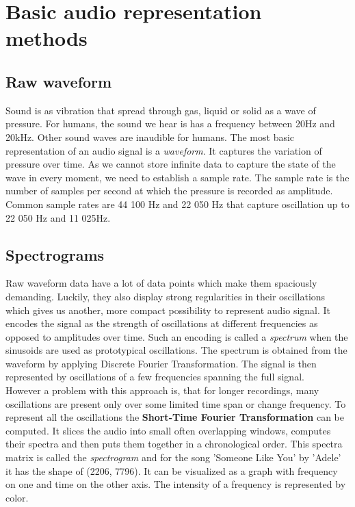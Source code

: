 \section{Basic audio representation methods}\label{sec:basic_music_representation_methods}
 

\subsection{Raw waveform}
Sound is as vibration that spread through gas, liquid or solid as a wave of pressure. For humans, the sound we hear is has a frequency between 20Hz and 20kHz. Other sound waves are inaudible for humans. The most basic representation of an audio signal is a \textit{waveform}. It captures the variation of pressure over time. As we cannot store infinite data to capture the state of the wave in every moment, we need to establish a sample rate. The sample rate is the number of samples per second at which the pressure is recorded as amplitude. Common sample rates are 44 100 Hz and 22 050 Hz that capture oscillation up to 22 050 Hz and 11 025Hz.

\subsection{Spectrograms}
Raw waveform data have a lot of data points which make them spaciously demanding. Luckily, they also display strong regularities in their oscillations which gives us another, more compact possibility to represent audio signal. It encodes the signal as the strength of oscillations at different frequencies as opposed to amplitudes over time. Such an encoding is called a \textit{spectrum} when the sinusoids are used as prototypical oscillations.
The spectrum is obtained from the waveform by applying Discrete Fourier Transformation. The signal is then represented by oscillations of a few frequencies spanning the full signal. \\
However a problem with this approach is, that for longer recordings, many oscillations are present only over some limited time span or change frequency. To represent all the oscillations the \textbf{Short-Time Fourier Transformation} can be computed. It slices the audio into small often overlapping windows, computes their spectra and then puts them together in a chronological order. This spectra matrix is called the \textit{spectrogram} and for the song 'Someone Like You' by 'Adele' it has the shape of (2206, 7796). It can be visualized as a graph with frequency on one and time on the other axis. The intensity of a frequency is represented by color.

